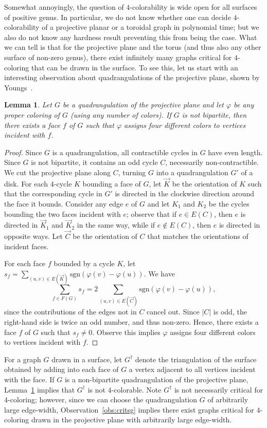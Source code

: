 \documentclass[12pt,twoside,openright,a4paper]{book}
\newtheorem{lemma}[theorem]{Lemma}
\newcommand{\sgn}{\text{sgn}}
\begin{document}
Somewhat annoyingly, the question of $4$-colorability is wide open for all surfaces of positive genus.
In particular, we do not know whether one can decide $4$-colorability of a projective planar or a toroidal
graph in polynomial time; but we also do not know any hardness result preventing this from being the case.
What we can tell is that for the projective plane and the torus (and thus also any other surface of non-zero genus),
there exist infinitely many graphs critical for $4$-coloring that can be drawn in the surface.
To see this, let us start with an interesting observation about quadrangulations of the projective plane,
shown by Youngs~\cite{youngs}.
\begin{lemma}\label{lemma:projall}
Let $G$ be a quadrangulation of the projective plane and let $\varphi$ be any proper coloring of $G$ (using any number of colors).
If $G$ is not bipartite, then there exists a face $f$ of $G$ such that $\varphi$ assigns four different colors to vertices
incident with $f$.
\end{lemma}
\begin{proof}
Since $G$ is a quadrangulation, all contractible cycles in $G$ have even length.  Since $G$ is not bipartite,
it contains an odd cycle $C$, necessarily non-contractible.  We cut the projective plane along $C$,
turning $G$ into a quadrangulation $G'$ of a disk.  For each $4$-cycle $K$ bounding a face of $G$,
let $\vec{K}$ be the orientation of $K$ such that the corresponding cycle in $G'$ is directed in the clockwise
direction around the face it bounds.  Consider any edge $e$ of $G$ and let $K_1$ and $K_2$ be the cycles bounding
the two faces incident with $e$; observe that if $e\in E(C)$, then $e$ is directed in $\vec{K}_1$ and $\vec{K}_2$
in the same way, while if $e\not\in E(C)$, then $e$ is directed in opposite ways.  Let $\vec{C}$ be the orientation
of $C$ that matches the orientations of incident faces.

For each face $f$ bounded by a cycle $K$, let $s_f=\sum_{(u,v)\in E(\vec{K})} \sgn(\varphi(v)-\varphi(u))$.
We have
$$\sum_{f\in F(G)} s_f=2\sum_{(u,v)\in E(\vec{C})} \sgn(\varphi(v)-\varphi(u)),$$ since the contributions of the edges not in $C$
cancel out.  Since $|C|$ is odd, the right-hand side is twice an odd number, and thus non-zero.  Hence, there exists a face $f$ of $G$
such that $s_f\neq 0$.  Observe this implies $\varphi$ assigns four different colors to vertices incident with $f$.
\end{proof}
For a graph $G$ drawn in a surface, let $G^\dagger$ denote the triangulation of the surface obtained by adding
into each face of $G$ a vertex adjacent to all vertices incident with the face.  If $G$ is a non-bipartite quadrangulation
of the projective plane, Lemma~\ref{lemma:projall} implies that $G^\dagger$ is not $4$-colorable.  Note $G^\dagger$ is not
necessarily critical for $4$-coloring; however, since we can choose the quadrangulation $G$ of arbitrarily large edge-width,
Observation~\ref{obs:critsg} implies there exist graphs critical for $4$-coloring drawn in the projective plane with arbitrarily
large edge-width.
\end{document}

